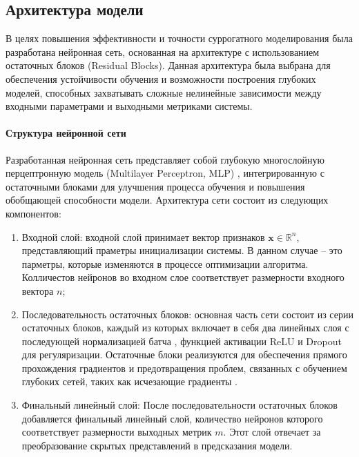 \subsection{Архитектура модели}\label{sec:ch4/sec3/subsec1}

В целях повышения эффективности и точности суррогатного моделирования была разработана нейронная сеть,
основанная на архитектуре с использованием остаточных блоков (Residual Blocks). Данная архитектура была
выбрана для обеспечения устойчивости обучения и возможности построения глубоких моделей, способных захватывать
сложные нелинейные зависимости между входными параметрами и выходными метриками системы.

\paragraph{Структура нейронной сети}\label{sec:ch4/sec3/subsec1/subsubsec1}

Разработанная нейронная сеть представляет собой глубокую многослойную перцептронную модель (Multilayer Perceptron, MLP) \cite*{goodfellow2016deep},
интегрированную с остаточными блоками для улучшения процесса обучения и повышения обобщающей способности модели.
Архитектура сети состоит из следующих компонентов:

\begin{enumerate}
    \item Входной слой: входной слой принимает вектор признаков $\mathbf{x} \in \mathbb{R}^n$,
          представляющий праметры инициализации системы. В данном случае -- это парметры,
          которые изменяются в процессе оптимизации алгоритма. Колличестов нейронов во входном
          слое соответствует размерности входного вектора $n$;

    \item Последовательность остаточных блоков: основная часть сети состоит из серии остаточных блоков,
          каждый из которых включает в себя два линейных слоя с последующей нормализацией батча \cite*{ioffe2015batch},
          функцией активации ReLU и Dropout для регуляризации. Остаточные блоки
          реализуются для обеспечения прямого прохождения градиентов и предотвращения
          проблем, связанных с обучением глубоких сетей, таких как исчезающие градиенты \cite*{he2016deep}.

    \item Финальный линейный слой: После последовательности остаточных блоков добавляется финальный линейный слой,
          количество нейронов которого соответствует размерности выходных метрик $m$.
          Этот слой отвечает за преобразование скрытых представлений в предсказания модели.
\end{enumerate}

